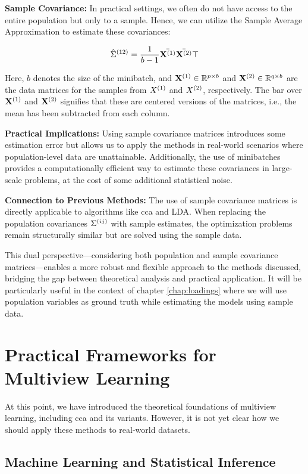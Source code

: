 \textbf{Sample Covariance:} In practical settings, we often do not have access to the entire population but only to a sample. Hence, we can utilize the Sample Average Approximation to estimate these covariances:

\[
    \hat{\Sigma}^{(12)} = \frac{1}{b-1} \bar{\mathbf{X}^{(1)}} \bar{\mathbf{X}^{(2)}}\top
\]

Here, \(b\) denotes the size of the minibatch, and \(\mathbf{X}^{(1)} \in \mathbb{R}^{p \times b}\) and \(\mathbf{X}^{(2)} \in \mathbb{R}^{q \times b}\) are the data matrices for the samples from \(X^{(1)}\) and \(X^{(2)}\), respectively. The bar over \(\mathbf{X}^{(1)}\) and \(\mathbf{X}^{(2)}\) signifies that these are centered versions of the matrices, i.e., the mean has been subtracted from each column.

\textbf{Practical Implications:} Using sample covariance matrices introduces some estimation error but allows us to apply the methods in real-world scenarios where population-level data are unattainable. Additionally, the use of minibatches provides a computationally efficient way to estimate these covariances in large-scale problems, at the cost of some additional statistical noise.

\textbf{Connection to Previous Methods:} The use of sample covariance matrices is directly applicable to algorithms like \acrshort{cca} and LDA. When replacing the population covariances \(\Sigma^{(ij)}\) with sample estimates, the optimization problems remain structurally similar but are solved using the sample data.

This dual perspective—considering both population and sample covariance matrices—enables a more robust and flexible approach to the methods discussed, bridging the gap between theoretical analysis and practical application.
It will be particularly useful in the context of chapter \ref{chap:loadings} where we will use population variables as ground truth while estimating the models using sample data.


\section{Practical Frameworks for Multiview Learning}

At this point, we have introduced the theoretical foundations of multiview learning, including \acrshort{cca} and its variants.
However, it is not yet clear how we should apply these methods to real-world datasets.

\subsection{Machine Learning and Statistical Inference}


